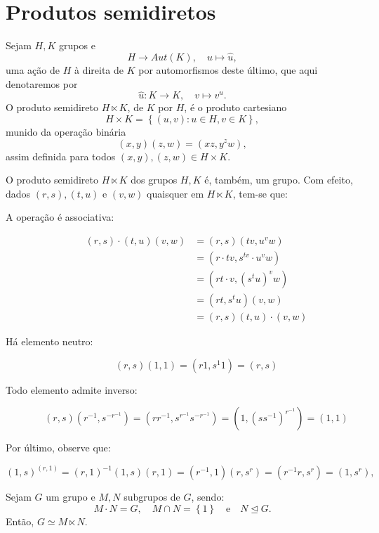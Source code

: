 \section{Produtos semidiretos}\label{sec:produtos-semidiretos}

\begin{definition}\label{def:produtos-semidiretos}
  Sejam $H,K$ grupos e
  \[
    H\to{Aut(K)},\quad{u\mapsto\widehat{u}},
  \]
  uma ação de $H$ à direita de $K$ por automorfismos deste último, que aqui denotaremos por
  \[
    \widehat{u}:K\to{K},\quad{v\mapsto{v^{u}}}.
  \]
  O produto semidireto $H\ltimes{K}$, de $K$ por $H$, é o produto cartesiano
  \[
    H\times{K}
    =
    \left\{
      (u,v)
      :
      u\in{H},v\in{K}
      \right\},
  \]
  munido da operação binária
  \[
    (x,y)(z,w)=(xz,y^{z}w),
  \]
  assim definida para todos $(x,y),(z,w)\in{H\times{K}}$.
\end{definition}

O produto semidireto $H\ltimes{K}$ dos grupos $H,K$ é, também, um grupo. Com efeito, dados $(r,s),(t,u)$ e $(v,w)$ quaisquer em $H\ltimes{K}$, tem-se que:

\begin{description}
  \item[A operação é associativa:]
    \begin{align*}
      (r,s)\cdot{(t,u)(v,w)}
      &=(r,s)(tv,u^{v}w)                 \\
      &=(r\cdot{tv},s^{tv}\cdot{u^{v}w}) \\
      &=(rt\cdot{v},(s^{t}u)^{v}w)       \\
      &=(rt,s^{t}u)(v,w)                 \\
      &=(r,s)(t,u)\cdot{(v,w)}
    \end{align*}
  \item[Há elemento neutro:]
    \[
      (r,s)(1,1)=(r1,s^{1}1)=(r,s)
    \]
  \item[Todo elemento admite inverso:]
    \[
      (r,s)(r^{-1},s^{-r^{-1}})=(rr^{-1},s^{r^{-1}}s^{-r^{-1}})=(1,(ss^{-1})^{r^{-1}})=(1,1)
    \]
\end{description}

Por último, observe que:

\[
  (1,s)^{(r,1)}=(r,1)^{-1}(1,s)(r,1)=(r^{-1},1)(r,s^{r})=(r^{-1}r,s^{r})=(1,s^{r}),
\]

\begin{proposition}
  Sejam $G$ um grupo e $M,N$ subgrupos de $G$, sendo:
  \[
    M\cdot{N}=G,
    \quad
    M\cap{N}=\left\{1\right\}
    \quad\text{e}\quad
    N\unlhd{G}.
  \]
  Então, $G\simeq{M\ltimes{N}}$.
\end{proposition}

